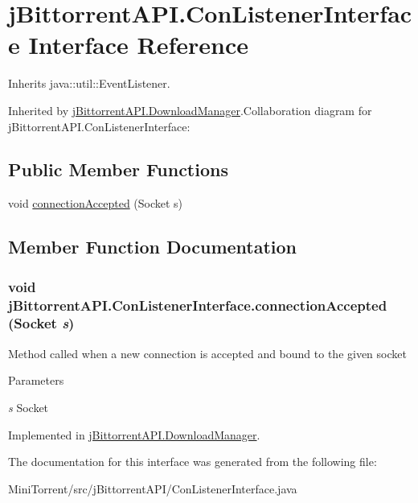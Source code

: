 \hypertarget{interfacej_bittorrent_a_p_i_1_1_con_listener_interface}{
\section{jBittorrentAPI.ConListenerInterface Interface Reference}
\label{interfacej_bittorrent_a_p_i_1_1_con_listener_interface}
}


Inherits java::util::EventListener.

Inherited by \hyperlink{classj_bittorrent_a_p_i_1_1_download_manager}{jBittorrentAPI.DownloadManager}.Collaboration diagram for jBittorrentAPI.ConListenerInterface:\subsection*{Public Member Functions}
\begin{DoxyCompactItemize}
\item 
void \hyperlink{interfacej_bittorrent_a_p_i_1_1_con_listener_interface_ae9112eed45ca89e112dbe8bc7aba6716}{connectionAccepted} (Socket s)
\end{DoxyCompactItemize}


\subsection{Member Function Documentation}
\hypertarget{interfacej_bittorrent_a_p_i_1_1_con_listener_interface_ae9112eed45ca89e112dbe8bc7aba6716}{
\subsubsection[{connectionAccepted}]{\setlength{\rightskip}{0pt plus 5cm}void jBittorrentAPI.ConListenerInterface.connectionAccepted (Socket {\em s})}}
\label{interfacej_bittorrent_a_p_i_1_1_con_listener_interface_ae9112eed45ca89e112dbe8bc7aba6716}
Method called when a new connection is accepted and bound to the given socket 
\begin{DoxyParams}{Parameters}
\item[{\em s}]Socket \end{DoxyParams}


Implemented in \hyperlink{classj_bittorrent_a_p_i_1_1_download_manager_a5e63578834159ff3471d3f6cfe6bfc5d}{jBittorrentAPI.DownloadManager}.

The documentation for this interface was generated from the following file:\begin{DoxyCompactItemize}
\item 
MiniTorrent/src/jBittorrentAPI/ConListenerInterface.java\end{DoxyCompactItemize}
